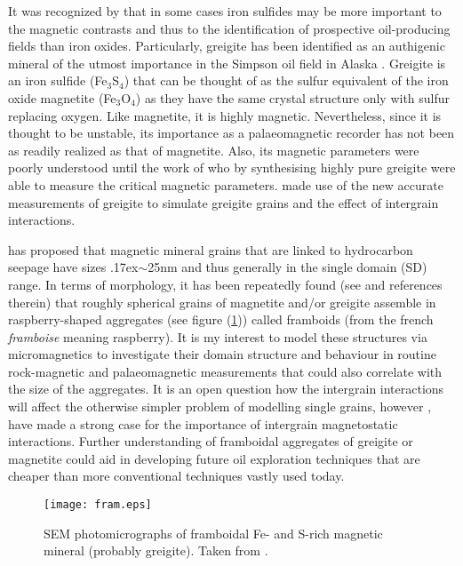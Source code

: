 It was recognized by \citet{Reynolds} that in some cases iron sulfides may be more important to the magnetic contrasts and thus to the identification of prospective oil-producing fields than iron oxides. Particularly, greigite has been identified as an authigenic mineral of the utmost importance in the Simpson oil field in Alaska \citep{Reynolds}. Greigite is an iron sulfide (Fe$_3$S$_4$) that can be thought of as the sulfur equivalent of the iron oxide magnetite (Fe$_3$O$_4$) as they have the same crystal structure only with sulfur replacing oxygen. Like magnetite, it is highly magnetic. Nevertheless, since it is thought to be unstable, its importance as a palaeomagnetic recorder has not been as readily realized as that of magnetite. Also, its magnetic parameters were poorly understood until the work of \citet{Chang} who by synthesising highly pure greigite were able to measure the critical magnetic parameters. \citet{Mxwt1} made use of the new accurate measurements of greigite to simulate greigite grains and the effect of intergrain interactions.\par

\citet{Liu} has proposed that magnetic mineral grains that are linked to hydrocarbon seepage have sizes {\raise.17ex\hbox{$\scriptstyle\sim$}}25nm and thus generally in the single domain (SD) range. In terms of morphology, it has been repeatedly found (see \citet{Aldana} and references therein) that roughly spherical grains of magnetite and/or greigite assemble in raspberry-shaped aggregates (see figure (\ref{Fig1})) called framboids (from the french \textit{framboise} meaning raspberry). It is my interest to model these structures via micromagnetics to investigate their domain structure and behaviour in routine rock-magnetic and palaeomagnetic measurements that could also correlate with the size of the aggregates. It is an open question how the intergrain interactions will affect the otherwise simpler problem of modelling single grains, however \citet{Mxwt2}, \citet{Mxwt1} have made a strong case for the importance of intergrain magnetostatic interactions. Further understanding of framboidal aggregates of greigite or magnetite could aid in developing future oil exploration techniques that are cheaper than more conventional techniques vastly used today.
\begin{figure}[ht]
\centering
\texttt{[image: fram.eps]}
\caption{SEM photomicrographs of framboidal Fe- and S-rich magnetic mineral (probably greigite). Taken from \citet{Costanzo2}.}
\label{Fig1}
\end{figure}